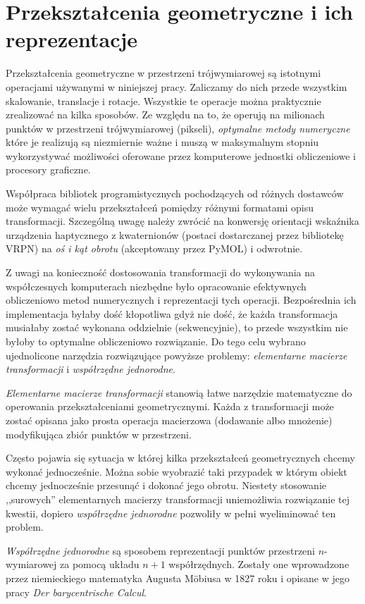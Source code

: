 \documentclass[licencjacka]{pracamgr}
\begin{document}
\section{Przekształcenia geometryczne i ich reprezentacje}
Przekształcenia geometryczne w przestrzeni trójwymiarowej są istotnymi operacjami używanymi w niniejszej pracy. Zaliczamy do nich przede wszystkim skalowanie, translacje i rotacje. Wszystkie te operacje można praktycznie zrealizować na kilka sposobów. Ze względu na to, że operują na milionach punktów w przestrzeni trójwymiarowej (pikseli), \textit{optymalne metody numeryczne} które je realizują są niezmiernie ważne i muszą w maksymalnym stopniu wykorzystywać możliwości oferowane przez komputerowe jednostki obliczeniowe i procesory graficzne. 

Współpraca bibliotek programistycznych pochodzących od różnych dostawców może wymagać wielu przekształceń pomiędzy różnymi formatami opisu transformacji. Szczególną uwagę należy zwrócić na konwersję orientacji wskaźnika urządzenia haptycznego z kwaternionów (postaci dostarczanej przez bibliotekę VRPN) na \textit{oś i kąt obrotu} (akceptowany przez PyMOL) i odwrotnie.

Z uwagi na konieczność dostosowania transformacji do wykonywania na współczesnych komputerach niezbędne było opracowanie efektywnych obliczeniowo metod numerycznych i reprezentacji tych operacji. Bezpośrednia ich implementacja byłaby dość kłopotliwa gdyż nie dość, że każda transformacja musiałaby zostać wykonana oddzielnie (sekwencyjnie), to przede wszystkim nie byłoby to optymalne obliczeniowo rozwiązanie. Do tego celu wybrano ujednolicone narzędzia rozwiązujące powyższe problemy: \textit{elementarne macierze transformacji} i \textit{współrzędne jednorodne}.

\textit{Elementarne macierze transformacji} stanowią łatwe narzędzie matematyczne do operowania przekształceniami geometrycznymi. Każda z transformacji może zostać opisana jako prosta operacja macierzowa (dodawanie albo mnożenie) modyfikująca zbiór punktów w przestrzeni.

Często pojawia się sytuacja w której kilka przekształceń geometrycznych chcemy wykonać jednocześnie. Można sobie wyobrazić taki przypadek w którym obiekt chcemy jednocześnie przesunąć i dokonać jego obrotu. Niestety stosowanie ,,surowych'' elementarnych macierzy transformacji uniemożliwia rozwiązanie tej kwestii, dopiero \textit{współrzędne jednorodne} pozwoliły w pełni wyeliminować ten problem.

\textit{Współrzędne jednorodne} są sposobem reprezentacji punktów przestrzeni $n$-wymiarowej za pomocą układu $n+1$ współrzędnych. Zostały one wprowadzone przez niemieckiego matematyka Augusta Möbiusa w 1827 roku i opisane w jego pracy \textit{Der barycentrische Calcul}. 
\end{document}
